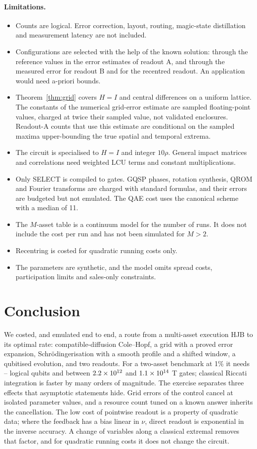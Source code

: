 \documentclass[11pt,a4paper]{article}
\theoremstyle{remark}
\begin{document}
\paragraph{Limitations.}
\begin{itemize}
\item Counts are logical. Error correction, layout, routing, magic-state
distillation and measurement latency are not included.
\item Configurations are selected with the help of the known solution: through the reference values in the error estimates of
readout A, and through the measured error for readout B and for the recentred readout. An
application would need a-priori bounds.
\item Theorem~\ref{thm:grid} covers $H=I$ and central differences on a
uniform lattice. The constants of the numerical grid-error estimate are sampled
floating-point values, charged at twice their sampled value, not validated
enclosures. Readout-A counts that use this estimate are conditional on the
sampled maxima upper-bounding the true spatial and temporal extrema.
\item The circuit is specialised to $H=I$ and integer $10\rho$. General
impact matrices and correlations need weighted LCU terms and constant
multiplications.
\item Only SELECT is compiled to gates. GQSP phases, rotation synthesis, QROM and Fourier transforms are
charged with standard formulas, and their errors are budgeted but not emulated. The QAE cost uses the
canonical scheme with a median of 11.
\item The $M$-asset table is a continuum model for the number of runs. It does
not include the cost per run and has not been simulated for $M>2$.
\item Recentring is costed for quadratic running costs only.
\item The parameters are synthetic, and the model omits spread costs,
participation limits and sales-only constraints.
\end{itemize}

\section{Conclusion}

We costed, and emulated end to end, a route from a multi-asset execution
HJB to its optimal rate: compatible-diffusion Cole--Hopf, a grid with a
proved error expansion, Schr\"odingerisation with a smooth profile
and a shifted window, a qubitised evolution, and two readouts. For a
two-asset benchmark at 1\% it needs \QBOne--\QAOne{} logical qubits and between
$2.2\times10^{12}$ and $1.1\times10^{14}$ T gates; classical Riccati integration is faster by
many orders of magnitude. The exercise separates three effects that asymptotic statements hide. Grid errors of the control
cancel at isolated parameter values, and a resource count tuned on a known answer inherits the cancellation. The low cost of
pointwise readout is a property of quadratic data; where the feedback has a bias linear in $\nu$, direct readout is exponential in
the inverse accuracy. A change of variables along a classical extremal removes that factor, and for quadratic running costs it does
not change the circuit.
\end{document}
